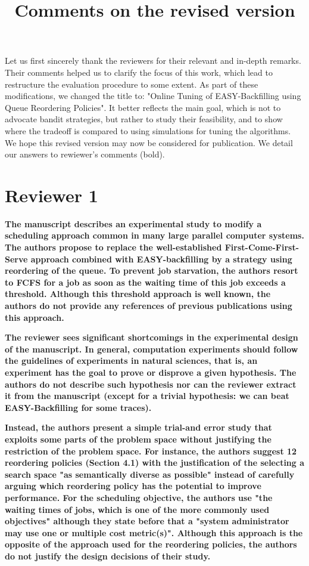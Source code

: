 \documentclass[]{article}
\title{Comments on the revised version}
\begin{document}
\maketitle

Let us first sincerely thank the reviewers for their relevant and in-depth
remarks. Their comments helped us to clarify the focus of this work, which
lead to restructure the evaluation procedure to some extent. As part of these
modifications, we changed the title to: "Online Tuning of EASY-Backfilling
using Queue Reordering Policies". It better reflects the main goal, which is
not to advocate bandit strategies, but rather to study their feasibility, and
to show where the tradeoff is compared to using simulations for tuning the
algorithms. We hope this revised version may now be considered for publication. 
We detail our answers to rewiewer's comments (bold).

\section{Reviewer 1}

\textbf{The manuscript describes an experimental study to modify a scheduling
approach common in many large parallel computer systems. The authors propose to
replace the well-established First-Come-First-Serve approach combined  with
EASY-backfilling by a strategy using reordering of the queue. To prevent job
starvation, the authors resort to FCFS for a job as soon as the waiting time of
this job exceeds a threshold. Although this threshold approach is well known,
the authors do not provide any references of previous publications using this
approach. }

\textbf{The reviewer sees significant shortcomings in the experimental design
of the manuscript. In general, computation experiments should follow the
guidelines of experiments in natural sciences, that is, an experiment has the
goal to prove or disprove a given hypothesis. The authors do not describe such
hypothesis nor can the reviewer extract it from the manuscript (except for a
trivial hypothesis: we can beat EASY-Backfilling for some traces). }

\textbf{Instead, the authors present a simple trial-and error study that
exploits some parts of the problem space without justifying the restriction of
the problem space. For instance, the authors suggest 12 reordering policies
(Section 4.1) with the justification of the selecting a search space "as
semantically diverse as possible" instead of carefully arguing which reordering
policy has the potential to improve performance. For the scheduling objective,
the authors use "the waiting times of jobs, which is one of the more commonly
used objectives" although they state before that a "system administrator may
use one or multiple cost metric(s)". Although this approach is the opposite of
the approach used for the reordering policies, the authors do not justify the
design decisions of their study. }
\end{document}

